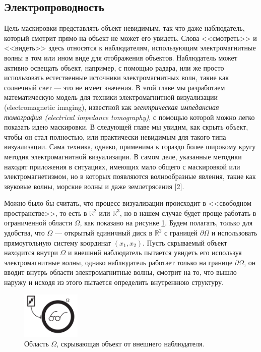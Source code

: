 \documentclass[a4paper, 12pt]{article}
\begin{document}
\subsection{Электропроводность}


Цель маскировки представлять объект невидимым, так что даже наблюдатель, который смотрит прямо на объект не может его увидеть. Слова <<смотреть>> и <<видеть>> здесь относятся к наблюдателям, использующим электромагнитные волны в том или ином виде для отображения объектов. Наблюдатель может активно освещать объект, например, с помощью радара, или же просто использовать естественные источники электромагнитных волн, такие как солнечный свет --- это не имеет значения. В этой главе мы разработаем математическую модель для техники электромагнитной визуализации (electromagnetic imaging), известной как \textit{электрическая импедансная томография (electrical impedance tomography)}, с помощью которой можно легко показать идею маскировки. В следующей главе мы увидим, как скрыть объект, чтобы он стал полностью, или практически невидимым для такого типа визуализации. Сама техника, однако, применима к гораздо более широкому кругу методик электромагнитной визуализации. В самом деле, указанные методики находят приложения в ситуациях, имеющих мало общего с маскировкой или электромагнетизмом, но в которых появляются волнообразные явления, такие как звуковые волны, морские волны и даже землетрясения [2].


Можно было бы считать, что процесс визуализации происходит в <<свободном пространстве>>, то есть в $\mathbb{R}^2$ или $\mathbb{R}^3$, но в нашем случае будет проще работать в ограниченной области $\Omega$, как показано на рисунке \ref{fig:1}. Будем полагать, только для удобства, что $\Omega$ --- открытый единичный диск в $\mathbb{R}^2$ с границей $\partial \Omega$ и использовать прямоугольную систему координат $(x_1, x_2)$. Пусть скрываемый объект находится внутри $\Omega$ и внешний наблюдатель пытается увидеть его используя электромагнитные волны, однако наблюдатель работает только на границе $\partial \Omega$, он вводит внутрь области электромагнитные волны, смотрит на то, что вышло наружу и исходя из этого пытается определить внутреннюю структуру.
\begin{figure}[t]
  \centering
  \includegraphics[width=0.25\textwidth]{1.png}
  \caption{Область $\Omega$, скрывающая объект от внешнего наблюдателя.}
  \label{fig:1}
\end{figure}
\end{document}
